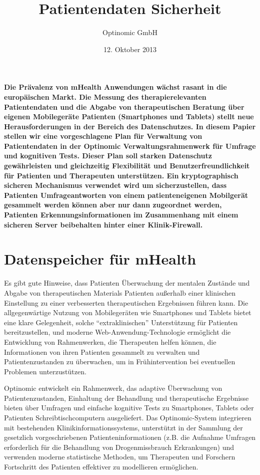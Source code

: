 \documentclass[DIV=calc,paper=a4,fontsize=11pt,twocolumn]{scrartcl}
\title{Patientendaten Sicherheit}
\author{Optinomic GmbH}
\date{12. Oktober 2013}
\begin{document}
\maketitle

\thispagestyle{fancy}

{\setlength\parindent{0pt} \textbf{Die Prävalenz von mHealth
    Anwendungen wächst rasant in die europäischen Markt. Die Messung
    des therapierelevanten Patientendaten und die Abgabe von
    therapeutischen Beratung über eigenen Mobilegeräte Patienten
    (Smartphones und Tablets) stellt neue Herausforderungen in der
    Bereich des Datenschutzes. In diesem Papier stellen wir eine
    vorgeschlagene Plan für Verwaltung von Patientendaten in der
    Optinomic Verwaltungsrahmenwerk für Umfrage und kognitiven
    Tests. Dieser Plan soll starken Datenschutz gewährleisten und
    gleichzeitig Flexibilität und Benutzerfreundlichkeit für Patienten
    und Therapeuten unterstützen. Ein kryptographisch sicheren
    Mechanismus verwendet wird um sicherzustellen, dass Patienten
    Umfrageantworten von einem patienteneigenen Mobilgerät gesammelt
    werden können aber nur dann zugeordnet werden, Patienten
    Erkennungsinformationen im Zusammenhang mit einem sicheren Server
    beibehalten hinter einer Klinik-Firewall.}}

\section*{Datenspeicher für mHealth}

Es gibt gute Hinweise, dass Patienten Überwachung der mentalen
Zustände und Abgabe von therapeutischen Materials Patienten außerhalb
einer klinischen Einstellung zu einer verbesserten therapeutischen
Ergebnissen führen kann. Die allgegenwärtige Nutzung von Mobilegeräten
wie Smartphones und Tablets bietet eine klare Gelegenheit, solche
``extraklinischen'' Unterstützung für Patienten bereitzustellen, und
moderne Web-Anwendung-Technologie ermöglicht die Entwicklung von
Rahmenwerken, die Therapeuten helfen können, die Informationen von
ihren Patienten gesammelt zu verwalten und Patientenzustanden zu
überwachen, um in Frühintervention bei eventuellen Problemen
unterzustützen.

Optinomic entwickelt ein Rahmenwerk, das adaptive Überwachung von
Patientenzustanden, Einhaltung der Behandlung und therapeutische
Ergebnisse bieten über Umfragen und einfache kognitive Tests zu
Smartphones, Tablets oder Patienten Schreibtischcomputern
ausgeliefert. Das Optinomic-System integrieren mit bestehenden
Klinikinformationssystems, unterstützt in der Sammlung der gesetzlich
vorgeschriebenen Patienteninformationen (z.B. die Aufnahme Umfragen
erforderlich für die Behandlung von Drogenmissbrauch Erkrankungen) und
verwenden moderne statistische Methoden, um Therapeuten und Forschern
Fortschritt des Patienten effektiver zu modellieren ermöglichen.
\end{document}
